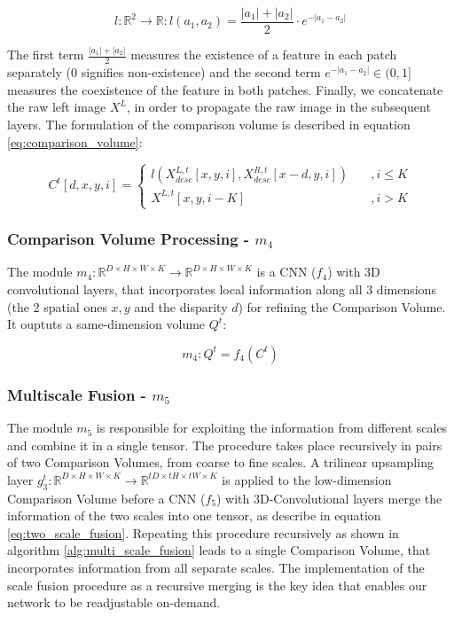 \documentclass[runningheads]{llncs}
\begin{document}
\begin{equation} \label{eq:m}
    l: \mathbb{R}^2 \rightarrow \mathbb{R}: l(a_1, a_2) = \frac{|a_1| + |a_2|}{2} \cdot e^{-|a_1 - a_2|}    
\end{equation}

 The first term $\frac{|a_1| + |a_2|}{2}$ measures the existence of a feature in each patch separately ($0$ signifies non-existence) and the second term $e^{-|a_1 - a_2|} \in (0,1]$ measures the coexistence of the feature in both patches. Finally, we concatenate the raw left image $X^L$, in order to propagate the raw image in the subsequent layers. The formulation of the comparison volume is described in equation \ref{eq:comparison_volume}:

\begin{equation}\label{eq:comparison_volume}
C^t[d, x, y, i] = 
    \begin{cases}
        l( X^{L, t}_{desc}[x,y,i], X^{R, t}_{desc}[x-d,y, i]) &\quad ,i \leq K \\
        X^{L,t}[x,y,i-K] &\quad ,i > K
     \end{cases}
\end{equation}{}  


\subsubsection{Comparison Volume Processing - $m_4$} The module $m_4: \mathbb{R}^{D \times H \times W \times K} \rightarrow \mathbb{R}^{D \times H \times W \times K}$ is a CNN ($f_4$) with 3D convolutional layers, that incorporates local information along all 3 dimensions (the 2 spatial ones $x,y$ and the disparity $d$) for refining the Comparison Volume. It ouptuts a same-dimension volume $Q^t$:

\begin{equation}
    m_4: Q^t = f_4(C^t)
\end{equation}


\subsubsection{Multiscale Fusion - $m_5$}

The module $m_5$ is responsible for exploiting the information from different scales and combine it in a single tensor. The procedure takes place recursively in pairs of two Comparison Volumes, from coarse to fine scales. A trilinear upsampling layer $g_3^t: \mathbb{R}^{D \times H \times W \times K} \rightarrow \mathbb{R}^{tD \times tH \times tW \times K}$ is applied to the low-dimension Comparison Volume before a CNN ($f_5$) with 3D-Convolutional layers merge the information of the two scales into one tensor, as describe in equation \ref{eq:two_scale_fusion}. Repeating this procedure recursively as shown in algorithm \ref{alg:multi_scale_fusion} leads to a single Comparison Volume, that incorporates information from all separate scales. The implementation of the scale fusion procedure as a recursive merging is the key idea that enables our network to be readjustable on-demand.
\end{document}
